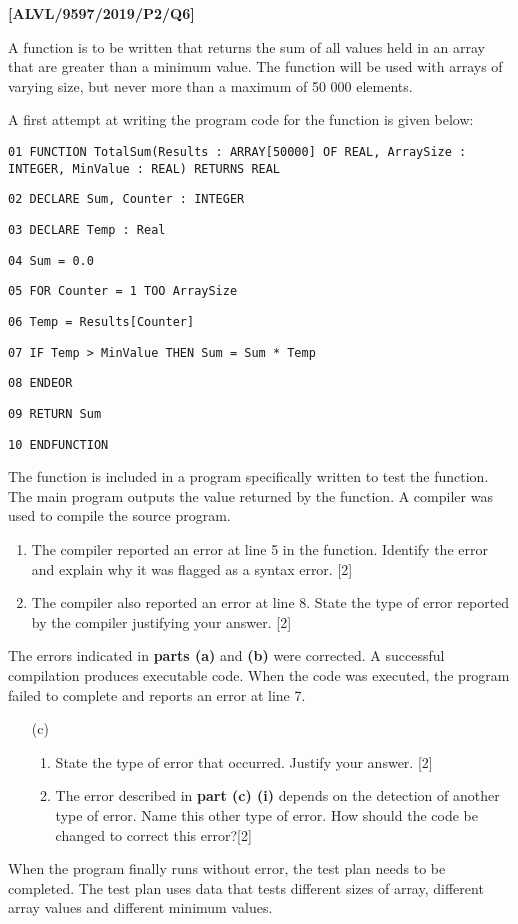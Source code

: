 \item \textbf{{[}ALVL/9597/2019/P2/Q6{]} }

A function is to be written that returns the sum of all values held
in an array that are greater than a minimum value. The function will
be used with arrays of varying size, but never more than a maximum
of 50 000 elements.

A first attempt at writing the program code for the function is given
below:

\noindent %
\noindent\begin{minipage}[t]{1\columnwidth}%
\texttt{01 FUNCTION TotalSum(Results : ARRAY{[}50000{]} OF REAL, ArraySize
: INTEGER, MinValue : REAL) RETURNS REAL }

\texttt{02 \qquad{}DECLARE Sum, Counter : INTEGER }

\texttt{03 \qquad{}DECLARE Temp : Real }

\texttt{04 \qquad{}Sum = 0.0 }

\texttt{05 \qquad{}\qquad{}FOR Counter = 1 TOO ArraySize }

\texttt{06 \qquad{}\qquad{}\qquad{}Temp = Results{[}Counter{]} }

\texttt{07 \qquad{}\qquad{}\qquad{}IF Temp > MinValue THEN Sum
= Sum {*} Temp }

\texttt{08 \qquad{}\qquad{}ENDEOR }

\texttt{09 \qquad{}RETURN Sum }

\texttt{10 ENDFUNCTION}%
\end{minipage}

The function is included in a program specifically written to test
the function. The main program outputs the value returned by the function.
A compiler was used to compile the source program.
\begin{enumerate}
\item The compiler reported an error at line 5 in the function. Identify
the error and explain why it was flagged as a syntax error. \hfill{}{[}2{]}
\item The compiler also reported an error at line 8. State the type of error
reported by the compiler justifying your answer. \hfill{}{[}2{]}
\end{enumerate}
The errors indicated in \textbf{parts (a)} and \textbf{(b)} were corrected.
A successful compilation produces executable code. When the code was
executed, the program failed to complete and reports an error at line
7.
\begin{enumerate}
\item[(c)]  {} 
\begin{enumerate}
\item State the type of error that occurred. Justify your answer. \hfill{}{[}2{]}
\item The error described in \textbf{part (c) (i)} depends on the detection
of another type of error. Name this other type of error. How should
the code be changed to correct this error?\hfill{}{[}2{]}
\end{enumerate}
\end{enumerate}
When the program finally runs without error, the test plan needs to
be completed. The test plan uses data that tests different sizes of
array, different array values and different minimum values. 

